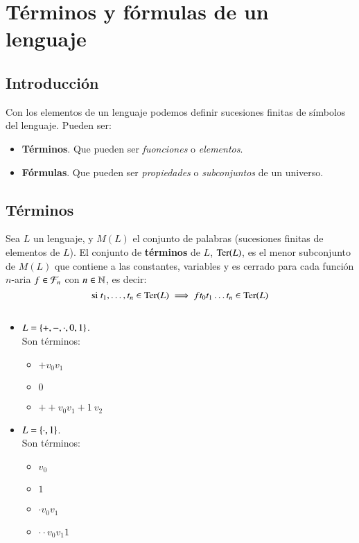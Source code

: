 
\chapter{Términos y fórmulas de un lenguaje}

\section{Introducción}

Con los elementos de un lenguaje podemos definir sucesiones finitas de símbolos del lenguaje. Pueden ser:
\begin{itemize}
    \item \textbf{Términos}. Que pueden ser \textit{fuonciones} o \textit{elementos}.
    \item \textbf{Fórmulas}. Que pueden ser \textit{propiedades} o \textit{subconjuntos} de un universo.
\end{itemize}

\section{Términos}
\begin{dfn}
    Sea $L$ un lenguaje, y $M(L)$ el conjunto de palabras (sucesiones finitas de elementos de $L$). El conjunto de \textbf{términos} de $L$, $\mathrm{Ter}(L)$, es el menor subconjunto de $M(L)$ que contiene a las constantes, variables y es cerrado para cada función $n$-aria $f \in \mathcal{F}_n$ con $n \in \mathbb{N}$, es decir:
    $$
        \text{si } t_1, \ldots, t_n \in \mathrm{Ter}(L) \implies f t_0 t_1 \ldots t_n \in \mathrm{Ter}(L)
    $$
\end{dfn}

\begin{eg}$ $
    \begin{itemize}
        \item $L = \left\{+, -, \cdot, 0, 1\right\}$.\\
        Son términos:
        \begin{itemize}
            \item $+ v_0 v_1$
            \item $0$
            \item $+ + v_0 v_1 + 1\ v_2$
        \end{itemize}
        \item $L = \left\{\cdot, 1\right\}$.\\
        Son términos:
        \begin{itemize}
            \item $v_0$
            \item $1$
            \item $\cdot v_0 v_1$
            \item $\cdot \cdot v_0 v_1 1$
        \end{itemize}
    \end{itemize}
\end{eg}

